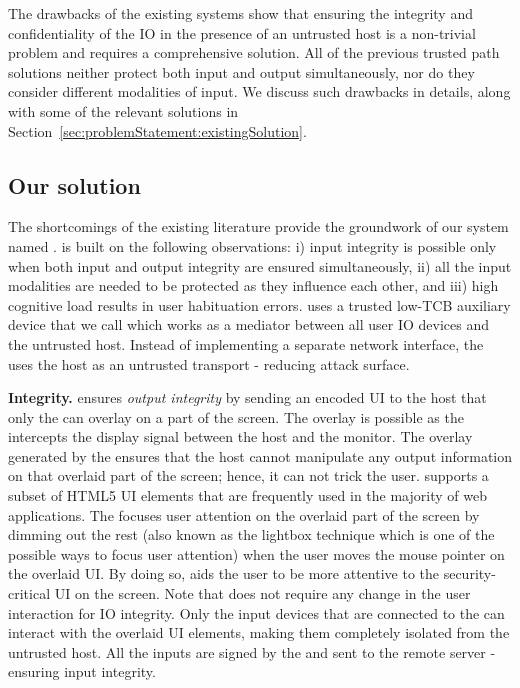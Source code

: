 The drawbacks of the existing systems show that ensuring the integrity and confidentiality of the IO in the presence of an untrusted host is a non-trivial problem and requires a comprehensive solution. All of the previous trusted path solutions neither protect both input and output simultaneously, nor do they consider different modalities of input. We discuss such drawbacks in details, along with some of the relevant solutions in Section~\ref{sec:problemStatement:existingSolution}.

 
\subsection{Our solution} The shortcomings of the existing literature provide the groundwork of our system named \name.
\name is built on the following observations: i) input integrity is possible only when both input and output integrity are ensured simultaneously, ii) all the input modalities are needed to be protected as they influence each other, and iii) high cognitive load results in user habituation errors. \name uses a trusted low-TCB auxiliary device that we call \device which works as a mediator between all user IO devices and the untrusted host. Instead of implementing a separate network interface, the \device uses the host as an untrusted transport - reducing attack surface.  

\textbf{Integrity.} \name ensures \emph{output integrity} by sending an encoded UI to the host that only the \device can overlay on a part of the screen. The overlay is possible as the \device intercepts the display signal between the host and the monitor. The overlay generated by the \device ensures that the host cannot manipulate any output information on that overlaid part of the screen; hence, it can not trick the user. \device supports a subset of HTML5 UI elements that are frequently used in the majority of web applications. The \device focuses user attention on the overlaid part of the screen by dimming out the rest (also known as the lightbox technique which is one of the possible ways to focus user attention) when the user moves the mouse pointer on the overlaid UI. By doing so, \name aids the user to be more attentive to the security-critical UI on the screen. Note that \name does not require any change in the user interaction for IO integrity. Only the input devices that are connected to the \device can interact with the overlaid UI elements, making them completely isolated from the untrusted host. All the inputs are signed by the \device and sent to the remote server - ensuring input integrity.

